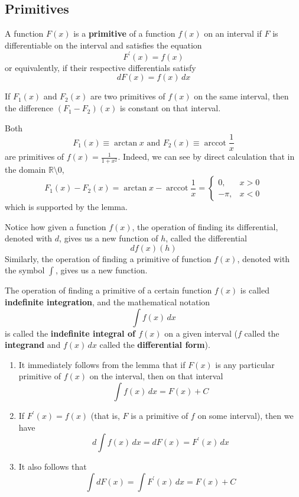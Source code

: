 \documentclass{article}
\DeclareMathOperator{\arccot}{arccot}
\begin{document}
    \subsection{Primitives}

      \begin{definition}[Primitive]
        A function $F(x)$ is a \textbf{primitive} of a function $f(x)$ on an interval if $F$ is differentiable on the interval and satisfies the equation 
        \[F^\prime (x) = f(x)\]
        or equivalently, if their respective differentials satisfy
        \[d F(x) = f(x) \,dx\]
      \end{definition}

      \begin{lemma}
        If $F_1(x)$ and $F_2 (x)$ are two primitives of $f(x)$ on the same interval, then the difference $(F_1 - F_2)(x)$ is constant on that interval. 
      \end{lemma}

    \begin{example}
    Both 
    \[F_1(x) \equiv \arctan{x} \text{ and } F_2(x) \equiv \arccot{\frac{1}{x}}\]
    are primitives of $f(x) = \frac{1}{1 + x^2}$. Indeed, we can see by direct calculation that in the domain $\mathbb{R} \setminus 0$, 
    \[F_1 (x) - F_2 (x) = \arctan{x} - \arccot{\frac{1}{x}} = \begin{cases}
    0, & x > 0 \\
    -\pi, & x < 0
    \end{cases}\]
    which is supported by the lemma. 
    \end{example}

      Notice how given a function $f(x)$, the operation of finding its differential, denoted with $d$, gives us a new function of $h$, called the differential 
      \[df(x)(h)\]
      Similarly, the operation of finding a primitive of function $f(x)$, denoted with the symbol $\int$, gives us a new function. 

      \begin{definition}
        The operation of finding a primitive of a certain function $f(x)$ is called \textbf{indefinite integration}, and the mathematical notation 
        \[\int f(x) \,dx\]
        is called the \textbf{indefinite integral of $f(x)$} on a given interval ($f$ called the \textbf{integrand} and $f(x)\,dx$ called the \textbf{differential form}). 
        \begin{enumerate}
          \item It immediately follows from the lemma that if $F(x)$ is any particular primitive of $f(x)$ on the interval, then on that interval 
          \[\int f(x) \,dx = F(x) + C\]
          \item If $F^\prime (x) = f(x)$ (that is, $F$ is a primitive of $f$ on some interval), then we have
          \[d \int f(x)\,dx = d F(x) = F^\prime (x) \,dx \]
          \item It also follows that 
          \[\int d F(x) = \int F^\prime (x)\,dx = F(x) + C\]
        \end{enumerate}
      \end{definition}
\end{document}
